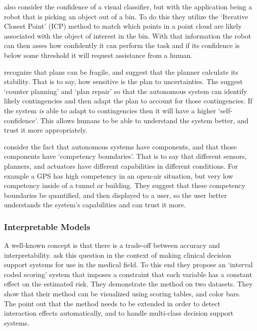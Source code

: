     \citet{Kaipa2015-hy} also consider the confidence of a visual classifier, but with the application being a robot that is picking an object out of a bin. To do this they utilize the `Iterative Closest Point' (ICP) method to match which points in a point cloud are likely associated with the object of interest in the bin. With that information the robot can then asses how confidently it can perform the task and if its confidence is below some threshold it will request assistance from a human. 

    \citet{Kuter2015-qh} recognize that plans can be fragile, and suggest that the planner calculate its stability. That is to say, how sensitive is the plan to uncertainties. The suggest `counter planning' and `plan repair' so that the autonomous system can identify likely contingencies and then adapt the plan to account for those contingencies. If the system \emph{is} able to adapt to contingencies then it will have a higher `self-confidence'. This allows humans to be able to understand the system better, and trust it more appropriately.

    \citet{Hutchins2015-if} consider the fact that autonomous systems have components, and that those components have `competency boundaries'. That is to say that different sensors, planners, and actuators have different capabilities in different conditions. For example a GPS has high competency in an open-air situation, but very low competency inside of a tunnel or building. They suggest that these competency boundaries be quantified, and then displayed to a user, so the user better understands the system's capabilities and can trust it more.

\subsubsection{Interpretable Models}
    A well-known concept is that there is a trade-off between accuracy and interpretability. \cite{Van_Belle2012-dt} ask this question in the context of making clinical decision support systems for use in the medical field. To this end they propose an `interval coded scoring' system that imposes a constraint that each variable has a constant effect on the estimated risk. They demonstrate the method on two datasets. They show that their method can be visualized using scoring tables, and color bars. The point out that the method needs to be extended in order to detect interaction effects automatically, and to handle multi-class decision support systems.

